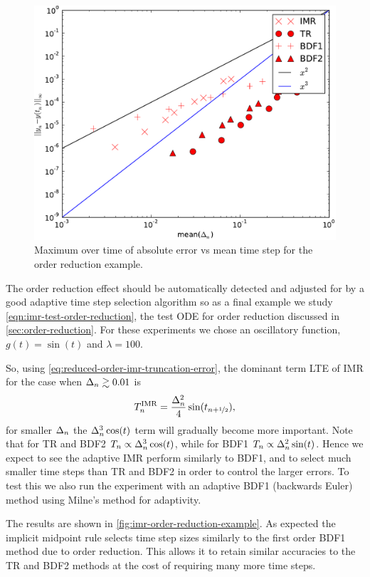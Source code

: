 \begin{figure}
  \centering  \includegraphics[width=1\textwidth]{plots/aimr_odes/order_reduction-maxoferrornormsvsmeanofdts.pdf}
  \caption{Maximum over time of absolute error vs mean time step for the order reduction example.}
  \label{fig:imr-order-reduction-convergence}
\end{figure}

The order reduction effect should be automatically detected and adjusted for by a good adaptive time step selection algorithm so as a final example we study \cref{eqn:imr-test-order-reduction}, the test ODE for order reduction discussed in \cref{sec:order-reduction}.
For these experiments we chose an oscillatory function, $g(t) = \sin(t)$ and $\lambda = 100$.

So, using \cref{eq:reduced-order-imr-truncation-error}, the dominant term LTE of IMR for the case when $\Delta_{n} \gtrsim 0.01$ is
\begin{equation}
  T_n^{\text{IMR}} = \frac{\Delta_{n}^2}{4} \sin(t_{n+\nicefrac{1}{2}}),
\end{equation}
for smaller $\Delta_{n}$ the $\Delta_{n}^3 \cos(t)$ term will gradually become more important.
Note that for TR and BDF2 $T_n \propto \Delta_{n}^3 \cos(t)$, while for BDF1 $T_n \propto \Delta_{n}^2 \sin(t)$.
Hence we expect to see the adaptive IMR perform similarly to BDF1, and to select much smaller time steps than TR and BDF2 in order to control the larger errors.
To test this we also run the experiment with an adaptive BDF1 (backwards Euler) method using Milne's method for adaptivity.

The results are shown in \cref{fig:imr-order-reduction-example}. 
As expected the implicit midpoint rule selects time step sizes similarly to the first order BDF1 method due to order reduction.
This allows it to retain similar accuracies to the TR and BDF2 methods at the cost of requiring many more time steps.

